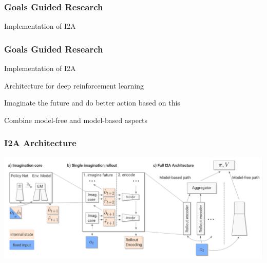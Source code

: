 \begin{frame}
    \frametitle{Goals Guided Research}

\begin{PraesentationAufzaehlung}
    \item Implementation of I2A
    \item 
\end{PraesentationAufzaehlung}

\end{frame}
\clearpage

\begin{frame}
    \frametitle{Goals Guided Research}

\begin{PraesentationAufzaehlung}
    \item Implementation of I2A
    \item 
\end{PraesentationAufzaehlung}

\end{frame}
\clearpage



\begin{frame}

\begin{PraesentationAufzaehlung}
    \item Architecture for deep reinforcement learning
    \item Imaginate the future and do better action based on this
    \item Combine model-free and model-based aspects
\end{PraesentationAufzaehlung}

\end{frame}
\clearpage

\begin{frame}
    \frametitle{I2A Architecture}


\includegraphics[width=\columnwidth]{./Images/i2a_architecture.png}%

    
\end{frame}
\clearpage

